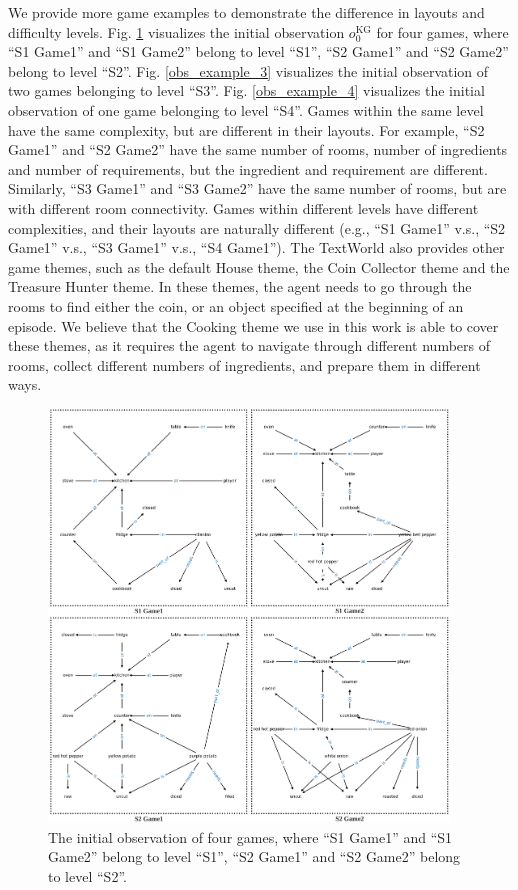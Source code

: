 \documentclass[11pt]{article}
\begin{document}
We provide more game examples to demonstrate the difference in layouts and difficulty levels. 
Fig. \ref{obs_example_1-2} visualizes the initial observation $o_0^{\text{KG}}$ for four games, where ``S1 Game1'' and ``S1 Game2'' belong to level ``S1'', ``S2 Game1'' and ``S2 Game2'' belong to level ``S2''. 
Fig. \ref{obs_example_3} visualizes the initial observation of two games belonging to level ``S3''. Fig. \ref{obs_example_4} visualizes the initial observation of one game belonging to level ``S4''.
Games within the same level have the same complexity, but are different in their layouts. For example, ``S2 Game1'' and ``S2 Game2'' have the same number of rooms, number of ingredients and number of requirements, but the 
ingredient and requirement are different. 
Similarly, ``S3 Game1'' and ``S3 Game2'' have the same number of rooms, but are with different room connectivity. 
Games within different levels have different complexities, and their layouts are naturally different (e.g., ``S1 Game1'' v.s., ``S2 Game1'' v.s., ``S3 Game1'' v.s., ``S4 Game1''). 
The TextWorld also provides other game themes, such as the default House theme, the Coin Collector theme and the Treasure Hunter theme. 
In these themes, the agent needs to go through the rooms to find either the coin, or an object specified at the beginning of an episode. 
We believe that the Cooking theme we use in this work is able to cover these themes, as it requires the agent to navigate through different numbers of rooms, collect different numbers of ingredients, and prepare them in different ways. 


\begin{figure}[t!]
\centering
\includegraphics[width=0.95\textwidth]{obs_example_1-2.pdf}
\caption{The initial observation of four games, where ``S1 Game1'' and ``S1 Game2'' belong to level ``S1'', ``S2 Game1'' and ``S2 Game2'' belong to level ``S2''.}
\label{obs_example_1-2}
\end{figure}
\end{document}
